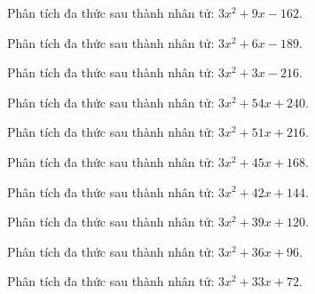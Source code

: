 \begin{bt}
	Phân tích đa thức sau thành nhân tử: $3 x^2 + 9 x - 162$.
\end{bt}
\begin{bt}
	Phân tích đa thức sau thành nhân tử: $3 x^2 + 6 x - 189$.
\end{bt}
\begin{bt}
	Phân tích đa thức sau thành nhân tử: $3 x^2 + 3 x - 216$.
\end{bt}
\begin{bt}
	Phân tích đa thức sau thành nhân tử: $3 x^2 + 54 x + 240$.
\end{bt}
\begin{bt}
	Phân tích đa thức sau thành nhân tử: $3 x^2 + 51 x + 216$.
\end{bt}
\begin{bt}
	Phân tích đa thức sau thành nhân tử: $3 x^2 + 45 x + 168$.
\end{bt}
\begin{bt}
	Phân tích đa thức sau thành nhân tử: $3 x^2 + 42 x + 144$.
\end{bt}
\begin{bt}
	Phân tích đa thức sau thành nhân tử: $3 x^2 + 39 x + 120$.
\end{bt}
\begin{bt}
	Phân tích đa thức sau thành nhân tử: $3 x^2 + 36 x + 96$.
\end{bt}
\begin{bt}
	Phân tích đa thức sau thành nhân tử: $3 x^2 + 33 x + 72$.
\end{bt}
